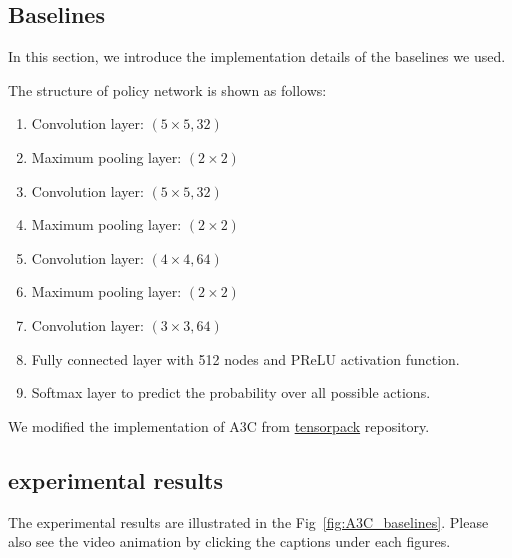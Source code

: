 \subsection{Baselines}

In this section, we introduce the implementation details of the baselines we used.

The structure of policy network is shown as follows:
\begin{enumerate}
\item Convolution layer: $(5 \times 5, 32)$ 
\item Maximum pooling layer: $(2 \times 2) $
\item Convolution layer: $(5 \times 5, 32)$ 
\item Maximum pooling layer: $(2 \times 2) $
\item Convolution layer: $(4 \times 4, 64)$ 
\item Maximum pooling layer: $(2 \times 2) $
\item Convolution layer: $(3 \times 3, 64)$ 
\item Fully connected layer with 512 nodes and PReLU activation function.
\item Softmax layer to predict the probability over all possible actions.
\end{enumerate}
We modified the implementation of A3C from \href{https://github.com/ppwwyyxx/tensorpack}{tensorpack} repository.


\subsection{experimental results}
The experimental results are illustrated in the Fig~\ref{fig:A3C_baselines}. Please also
see the video animation by clicking the captions under each figures. 


